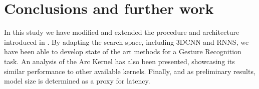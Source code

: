 \documentclass[a4paper, twocolumn]{article}
\begin{document}
\section{Conclusions and further work}

In this study we have modified and extended the procedure and architecture introduced in \cite{Fedorov2019}. By adapting the search space, including 3DCNN and RNNS, we have been able to develop state of the art methods for a Gesture Recognition task. An analysis of the Arc Kernel \cite{Swersky2014} has also been presented, showcasing its similar performance to other available kernels. Finally, and as preliminary results, model size is determined as a proxy for latency. 


\end{document}
